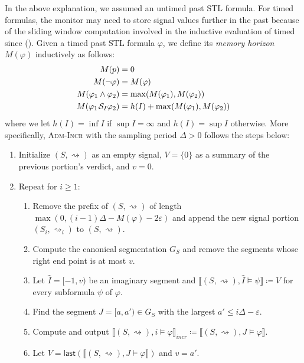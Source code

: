 \documentclass[iicol,lineno]{sn-jnl}
\renewcommand{\cref}{\Cref}
\newcommand{\last}{\textsf{last}}
\newcommand{\hb}{\rightsquigarrow}
\def\since{\kern.1em\mathcal{S}}
\newcommand{\?}{\text{?}}
\newcommand{\defeq}{\coloneqq}
\begin{document}
	In the above explanation, we assumed an untimed past STL formula.
	For timed formulas, the monitor may need to store signal values further in the past because of the sliding window computation involved in the inductive evaluation of timed since (\cref{fig:timedEval}).
	Given a timed past STL formula $\varphi$, we define its \emph{memory horizon} $M(\varphi)$ inductively as follows:
	\begin{align*}
		M(p) &= 0 \\
		M(\lnot \varphi) &= M(\varphi) \\
		M(\varphi_1 \land \varphi_2) &= \max(M(\varphi_1), M(\varphi_2))\\
		M(\varphi_1 \since_I \varphi_2) &= h(I) + \max(M(\varphi_1), M(\varphi_2))
	\end{align*}
	where we let $h(I) = \inf I$ if $\sup I = \infty$ and $h(I) = \sup I$ otherwise.
	More specifically, \textsc{Adm-Incr} with the sampling period $\Delta > 0$ follows the steps below:
	\begin{enumerate}[label*=\arabic*.]
		\item Initialize $(S,{\hb})$ as an empty signal, $V = \{0\}$ as a summary of the previous portion's verdict, and $v = 0$.
		\item Repeat for $i \geq 1$:
		\begin{enumerate}[leftmargin=5pt,label*=\arabic*]
			\item Remove the prefix of $(S,{\hb})$ of length $\max(0, (i-1)\Delta - M(\varphi) - 2\varepsilon)$ and append the new signal portion $(S_i,{\hb}_i)$ to $(S,{\hb})$.
			\item Compute the canonical segmentation $G_S$ and remove the segments whose right end point is at most $v$.
			\item Let $\hat{I} = [-1, v)$ be an imaginary segment and $\llbracket (S, {\hb}), \hat{I} \models \psi \rrbracket \defeq V$ for every subformula $\psi$ of $\varphi$.
			\item Find the segment $J = [a, a') \in G_S$ with the largest $a' \leq i\Delta-\varepsilon$.
			\item Compute and output $\llbracket (S, {\hb}), i \models \varphi \rrbracket_{\textit{incr}} \defeq \llbracket (S, {\hb}), J \models \varphi \rrbracket$.
			\item Let $V = \last(\llbracket (S, {\hb}), J \models \varphi \rrbracket)$ and $v = a'$.
		\end{enumerate}
	\end{enumerate}
\end{document}
